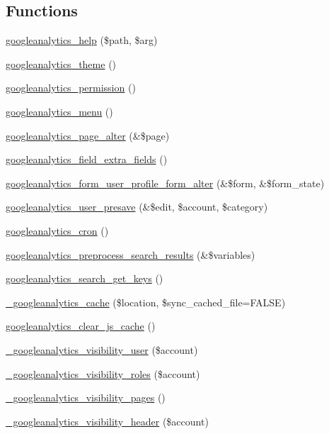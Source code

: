 \subsection*{Functions}
\begin{DoxyCompactItemize}
\item 
\hyperlink{googleanalytics_8module_a10055ad1b7bc9042ac16b1b7dace57de}{googleanalytics\_\-help} (\$path, \$arg)
\item 
\hyperlink{googleanalytics_8module_a663727599ce5534bc4c145ff1b600b8d}{googleanalytics\_\-theme} ()
\item 
\hyperlink{googleanalytics_8module_ae66161f9d90584b809a6a68445ba4da7}{googleanalytics\_\-permission} ()
\item 
\hyperlink{googleanalytics_8module_a6fa96d968af1105942266ae3e32858be}{googleanalytics\_\-menu} ()
\item 
\hyperlink{googleanalytics_8module_a08280011b658d2c0c1302eab3951f240}{googleanalytics\_\-page\_\-alter} (\&\$page)
\item 
\hyperlink{googleanalytics_8module_a7280096e9cb3e2b5f020f9f31dbfcfd1}{googleanalytics\_\-field\_\-extra\_\-fields} ()
\item 
\hyperlink{googleanalytics_8module_ad631ad0346f1f5a589887233c103ac78}{googleanalytics\_\-form\_\-user\_\-profile\_\-form\_\-alter} (\&\$form, \&\$form\_\-state)
\item 
\hyperlink{googleanalytics_8module_ac4b9f0ae49deb0cc6be3e2bc164d8412}{googleanalytics\_\-user\_\-presave} (\&\$edit, \$account, \$category)
\item 
\hyperlink{googleanalytics_8module_aa413822743813597fe3944c364d03006}{googleanalytics\_\-cron} ()
\item 
\hyperlink{googleanalytics_8module_af643e5263879dfd58196eca6e850edc5}{googleanalytics\_\-preprocess\_\-search\_\-results} (\&\$variables)
\item 
\hyperlink{googleanalytics_8module_a92c9e263a13d97031e1597db4f43af48}{googleanalytics\_\-search\_\-get\_\-keys} ()
\item 
\hyperlink{googleanalytics_8module_afefec8ddd7cf3beac77ad646aebbb675}{\_\-googleanalytics\_\-cache} (\$location, \$sync\_\-cached\_\-file=FALSE)
\item 
\hyperlink{googleanalytics_8module_ade82c3b418d046e498a1e2cc6b075756}{googleanalytics\_\-clear\_\-js\_\-cache} ()
\item 
\hyperlink{googleanalytics_8module_a17b559139935d05a4b7c2b26aa2b51db}{\_\-googleanalytics\_\-visibility\_\-user} (\$account)
\item 
\hyperlink{googleanalytics_8module_a2a9375ef0b0ef1b4cffc3fb8923d1c77}{\_\-googleanalytics\_\-visibility\_\-roles} (\$account)
\item 
\hyperlink{googleanalytics_8module_aabd650fcedc5f4053c9e5f3689d6f33f}{\_\-googleanalytics\_\-visibility\_\-pages} ()
\item 
\hyperlink{googleanalytics_8module_a2a9d546b674a43e5555343b2ac7ba07d}{\_\-googleanalytics\_\-visibility\_\-header} (\$account)
\end{DoxyCompactItemize}


